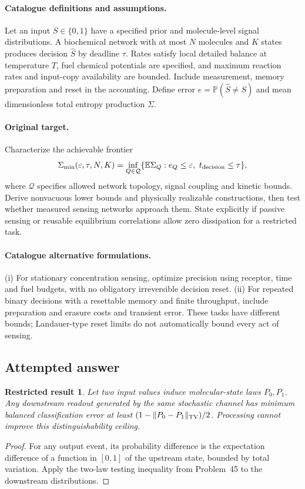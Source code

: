 \documentclass[11pt]{article}
\newcommand{\E}{\mathbb E}
\newcommand{\Prob}{\mathbb P}
\providecommand{\E}{\mathbb E}
\providecommand{\Prob}{\mathbb P}
\newtheorem{attemptresult}{Restricted result}[section]
\begin{document}
\paragraph{Catalogue definitions and assumptions.}
Let an input $S\in\{0,1\}$ have a specified prior and molecule-level signal distributions. A biochemical network with at most $N$ molecules and $K$ states produces decision $\widehat S$ by deadline $\tau$. Rates satisfy local detailed balance at temperature $T$, fuel chemical potentials are specified, and maximum reaction rates and input-copy availability are bounded. Include measurement, memory preparation and reset in the accounting. Define error $e=\Prob(\widehat S\ne S)$ and mean dimensionless total entropy production $\Sigma$.
\paragraph{Original target.}
Characterize the achievable frontier
\[\Sigma_{\min}(\varepsilon,\tau,N,K)=\inf_{Q\in\mathcal Q}\{\E\Sigma_Q:e_Q\le\varepsilon,\ t_{\rm decision}\le\tau\},\]
where $\mathcal Q$ specifies allowed network topology, signal coupling and kinetic bounds. Derive nonvacuous lower bounds and physically realizable constructions, then test whether measured sensing networks approach them. State explicitly if passive sensing or reusable equilibrium correlations allow zero dissipation for a restricted task.
\paragraph{Catalogue alternative formulations.}
(i) For stationary concentration sensing, optimize precision using receptor, time and fuel budgets, with no obligatory irreversible decision reset. (ii) For repeated binary decisions with a resettable memory and finite throughput, include preparation and erasure costs and transient error. These tasks have different bounds; Landauer-type reset limits do not automatically bound every act of sensing.
\subsection{Attempted answer}
\begin{attemptresult}
Let two input values induce molecular-state laws $P_0,P_1$. Any downstream readout generated by the same stochastic channel has minimum balanced classification error at least $(1-\|P_0-P_1\|_{\rm TV})/2$. Processing cannot improve this distinguishability ceiling.
\end{attemptresult}
\begin{proof}
For any output event, its probability difference is the expectation difference of a function in $[0,1]$ of the upstream state, bounded by total variation. Apply the two-law testing inequality from Problem~45 to the downstream distributions.
\end{proof}
\end{document}
